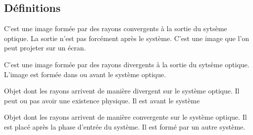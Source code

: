 \documentclass[french]{yLectureNote}
\begin{document}
\subsection{Définitions}
\begin{definition}
C'est une image formée par des rayons convergents à la sortie du sytsème optique. La sortie n'est pas forcément après le système. C'est une image que l'on peut projeter sur un écran.
\end{definition}
\begin{definition}
C'est une image formée par des rayons divergents à la sortie du sytsème optique. L'image est formée dans ou avant le système optique.
\end{definition}
\begin{definition}
Objet dont les rayons arrivent de manière divergent sur le système optique. Il peut ou pas avoir une existence physique. Il est avant le système
\end{definition}
\begin{definition}
Objet dont les rayons arrivent de manière convergente sur le système optique. Il est placé après la phase d'entrée du système. Il est formé par un autre système.
\end{definition}
\end{document}
